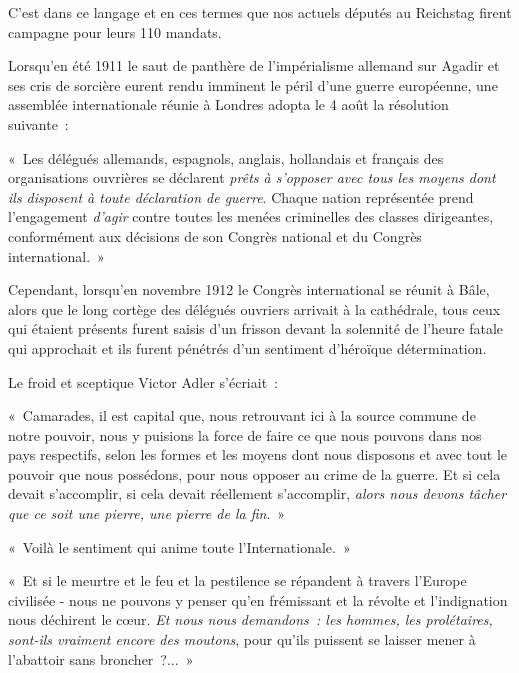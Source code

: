 \documentclass[french,twoside]{book} %
\newenvironment{quoteblock}%
  {\begin{quoting}}
  {\end{quoting}}
\newenvironment{quotebar}{%
    \def\FrameCommand{{\color{rubric!10!}\vrule width 0.5em} \hspace{0.9em}}%
    \def\OuterFrameSep{\itemsep} %
    \MakeFramed {\advance\hsize-\width \FrameRestore}
  }%
  {%
    \endMakeFramed
  }
\renewenvironment{quoteblock}%
  {%
    \savenotes
    \setstretch{0.9}
    \normalfont
    \begin{quotebar}
  }
  {%
    \end{quotebar}
    \spewnotes
  }
\begin{document}
\noindent C'est dans ce langage et en ces termes que nos actuels députés au Reichstag firent campagne pour leurs 110 mandats.\par
Lorsqu’en été 1911 le saut de panthère de l’impérialisme allemand sur Agadir et ses cris de sorcière eurent rendu imminent le péril d’une guerre européenne, une assemblée internationale réunie à Londres adopta le 4 août la résolution suivante :\par

\begin{quoteblock}
 \noindent « Les délégués allemands, espagnols, anglais, hollandais et français des organisations ouvrières se déclarent \emph{prêts à s’opposer avec tous les moyens dont ils disposent à toute déclaration de guerre}. Chaque nation représentée prend l’engagement \emph{d’agir} contre toutes les menées criminelles des classes dirigeantes, conformément aux décisions de son Congrès national et du Congrès international. »
\end{quoteblock}

\noindent Cependant, lorsqu’en novembre 1912 le Congrès international se réunit à Bâle, alors que le long cortège des délégués ouvriers arrivait à la cathédrale, tous ceux qui étaient présents furent saisis d’un frisson devant la solennité de l’heure fatale qui approchait et ils furent pénétrés d’un sentiment d’héroïque détermination.\par
Le froid et sceptique Victor Adler s’écriait :\par

\begin{quoteblock}
 \noindent « Camarades, il est capital que, nous retrouvant ici à la source commune de notre pouvoir, nous y puisions la force de faire ce que nous pouvons dans nos pays respectifs, selon les formes et les moyens dont nous disposons et avec tout le pouvoir que nous possédons, pour nous opposer au crime de la guerre. Et si cela devait s’accomplir, si cela devait réellement s’accomplir, \emph{alors nous devons tâcher que ce soit une pierre, une pierre de la fin}. »\par
 « Voilà le sentiment qui anime toute l’Internationale. »\par
 « Et si le meurtre et le feu et la pestilence se répandent à travers l’Europe civilisée - nous ne pouvons y penser qu’en frémissant et la révolte et l’indignation nous déchirent le cœur. \emph{Et nous nous demandons : les hommes, les prolétaires, sont-ils vraiment encore des moutons}, pour qu’ils puissent se laisser mener à l’abattoir sans broncher ?... »
\end{quoteblock}
\end{document}
